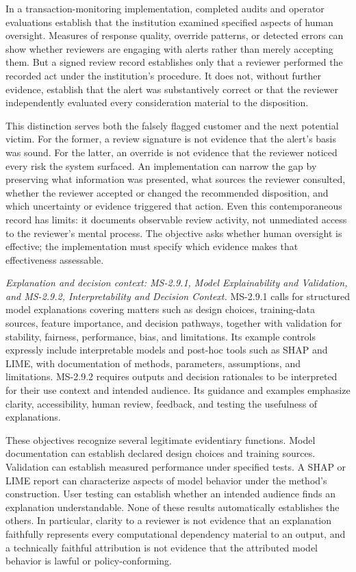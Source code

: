 In a transaction-monitoring implementation, completed audits and operator evaluations establish that the institution examined specified aspects of human oversight. Measures of response quality, override patterns, or detected errors can show whether reviewers are engaging with alerts rather than merely accepting them. But a signed review record establishes only that a reviewer performed the recorded act under the institution's procedure. It does not, without further evidence, establish that the alert was substantively correct or that the reviewer independently evaluated every consideration material to the disposition.

This distinction serves both the falsely flagged customer and the next potential victim. For the former, a review signature is not evidence that the alert's basis was sound. For the latter, an override is not evidence that the reviewer noticed every risk the system surfaced. An implementation can narrow the gap by preserving what information was presented, what sources the reviewer consulted, whether the reviewer accepted or changed the recommended disposition, and which uncertainty or evidence triggered that action. Even this contemporaneous record has limits: it documents observable review activity, not unmediated access to the reviewer's mental process. The objective asks whether human oversight is effective; the implementation must specify which evidence makes that effectiveness assessable.

\emph{Explanation and decision context: MS-2.9.1, Model Explainability and Validation, and MS-2.9.2, Interpretability and Decision Context.} MS-2.9.1 calls for structured model explanations covering matters such as design choices, training-data sources, feature importance, and decision pathways, together with validation for stability, fairness, performance, bias, and limitations. Its example controls expressly include interpretable models and post-hoc tools such as SHAP and LIME, with documentation of methods, parameters, assumptions, and limitations. MS-2.9.2 requires outputs and decision rationales to be interpreted for their use context and intended audience. Its guidance and examples emphasize clarity, accessibility, human review, feedback, and testing the usefulness of explanations.

These objectives recognize several legitimate evidentiary functions. Model documentation can establish declared design choices and training sources. Validation can establish measured performance under specified tests. A SHAP or LIME report can characterize aspects of model behavior under the method's construction. User testing can establish whether an intended audience finds an explanation understandable. None of these results automatically establishes the others. In particular, clarity to a reviewer is not evidence that an explanation faithfully represents every computational dependency material to an output, and a technically faithful attribution is not evidence that the attributed model behavior is lawful or policy-conforming.


